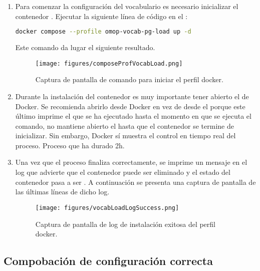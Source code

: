 \begin{enumerate}

    \item Para comenzar la configuración del vocabulario es necesario inicializar el contenedor . Ejecutar la siguiente línea de código en el :

    \begin{lstlisting}[language=sh]
    docker compose --profile omop-vocab-pg-load up -d\end{lstlisting}

    Este comando da lugar el siguiente resultado.

      \begin{figure}[H]
        \centering
        \texttt{[image: figures/composeProfVocabLoad.png]}
        \caption{Captura de pantalla de comando para iniciar el perfil docker.}
        \label{fig:composeProfVocabLoad}
    \end{figure}

    \item Durante la instalación del contenedor es muy importante tener abierto el  de Docker. Se recomienda abrirlo desde Docker en vez de desde el  porque este último imprime el  que se ha ejecutado hasta el momento en que se ejecuta el comando, no mantiene abierto el  hasta que el contenedor se termine de inicializar. Sin embargo, Docker sí muestra el control en tiempo real del proceso. Proceso que ha durado 2h.

    \item Una vez que el proceso finaliza correctamente, se imprime un mensaje en el log que advierte que el contenedor puede ser eliminado y el estado del contenedor pasa a ser . A continuación se presenta una captura de pantalla de las últimas líneas de dicho log.

 \begin{figure}[H]
        \centering
        \texttt{[image: figures/vocabLoadLogSuccess.png]}
        \caption{Captura de pantalla de log de instalación exitosa del perfil docker.}
        \label{fig:vocabLoadLogSuccess}
\end{figure}
    
    
\end{enumerate}

\subsection{Compobación de configuración correcta}

